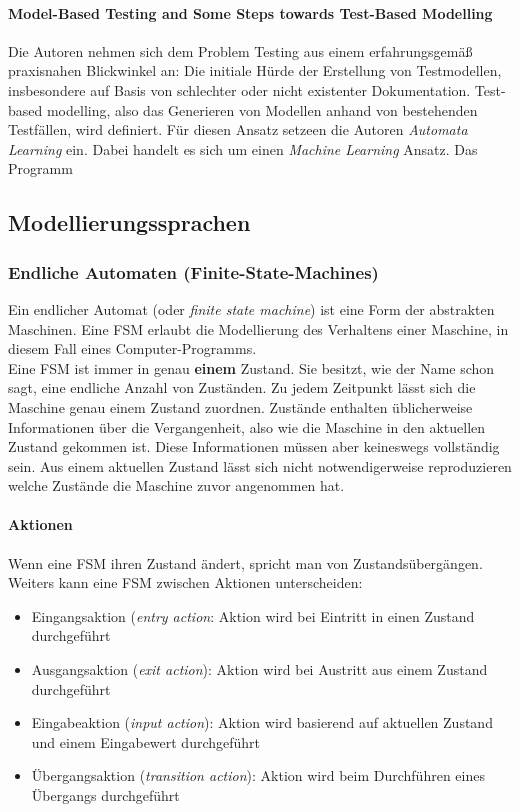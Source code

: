 \paragraph{Model-Based Testing and Some Steps towards Test-Based Modelling\cite{tretmans_model-based_2011}} Die Autoren nehmen sich dem Problem Testing aus einem erfahrungsgemäß praxisnahen Blickwinkel an: Die initiale Hürde der Erstellung von Testmodellen, insbesondere auf Basis von schlechter oder nicht existenter Dokumentation. Test-based modelling, also das Generieren von Modellen anhand von bestehenden Testfällen, wird definiert. Für diesen Ansatz setzeen die Autoren \textit{Automata Learning} ein. Dabei handelt es sich um einen \textit{Machine Learning} Ansatz\cite{narendra_learning_1974}. Das Programm 

\subsection{Modellierungssprachen}
\label{sec:notations}
\subsubsection{Endliche Automaten (Finite-State-Machines)}
\label{sec:fsm}
Ein endlicher Automat (oder \textit{finite state machine}) ist eine Form der abstrakten Maschinen. Eine FSM erlaubt die Modellierung des Verhaltens einer Maschine, in diesem Fall eines Computer-Programms.\cite{wagner_modeling_2006}\\
Eine FSM ist immer in genau \textbf{einem} Zustand. Sie besitzt, wie der Name schon sagt, eine endliche Anzahl von Zuständen. Zu jedem Zeitpunkt lässt sich die Maschine genau einem Zustand zuordnen. Zustände enthalten üblicherweise Informationen über die Vergangenheit, also wie die Maschine in den aktuellen Zustand gekommen ist. Diese Informationen müssen aber keineswegs vollständig sein. Aus einem aktuellen Zustand lässt sich nicht notwendigerweise reproduzieren welche Zustände die Maschine zuvor angenommen hat.\\

\paragraph{Aktionen}
Wenn eine FSM ihren Zustand ändert, spricht man von Zustandsübergängen. Weiters kann eine FSM zwischen Aktionen unterscheiden:
\begin{itemize}
\item Eingangsaktion (\textit{entry action}: Aktion wird bei Eintritt in einen Zustand durchgeführt
\item Ausgangsaktion (\textit{exit action}): Aktion wird bei Austritt aus einem Zustand durchgeführt
\item Eingabeaktion (\textit{input action}): Aktion wird basierend auf aktuellen Zustand und einem Eingabewert durchgeführt
\item Übergangsaktion (\textit{transition action}): Aktion wird beim Durchführen eines Übergangs durchgeführt
\end{itemize}

